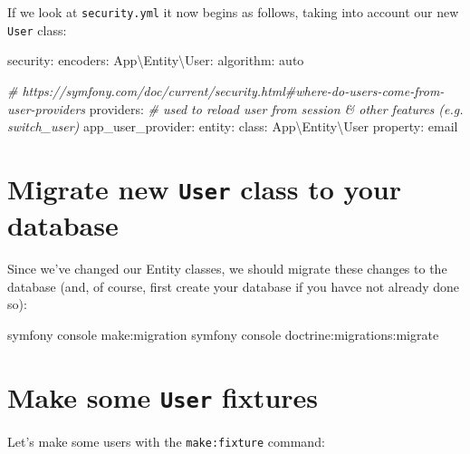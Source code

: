 \documentclass[a4paperpaper,openright]{book}
\newenvironment{Shaded}{}{}
\newcommand{\AttributeTok}[1]{\textcolor[rgb]{0.49,0.56,0.16}{#1}}
\newcommand{\CommentTok}[1]{\textcolor[rgb]{0.38,0.63,0.69}{\textit{#1}}}
\newcommand{\ExtensionTok}[1]{#1}
\newcommand{\FunctionTok}[1]{\textcolor[rgb]{0.02,0.16,0.49}{#1}}
\newcommand{\NormalTok}[1]{#1}
\begin{document}
If we look at \texttt{security.yml} it now begins as follows, taking
into account our new \texttt{User} class:

\begin{Shaded}
\begin{Highlighting}[]
    \FunctionTok{security:}
        \FunctionTok{encoders:}
            \FunctionTok{App\textbackslash{}Entity\textbackslash{}User:}
                \FunctionTok{algorithm:}\AttributeTok{ auto}
    
        \CommentTok{# https://symfony.com/doc/current/security.html#where-do-users-come-from-user-providers}
        \FunctionTok{providers:}
            \CommentTok{# used to reload user from session & other features (e.g. switch_user)}
            \FunctionTok{app_user_provider:}
                \FunctionTok{entity:}
                    \FunctionTok{class:}\AttributeTok{ App\textbackslash{}Entity\textbackslash{}User}
                    \FunctionTok{property:}\AttributeTok{ email}
\end{Highlighting}
\end{Shaded}

\hypertarget{migrate-new-user-class-to-your-database}{%
\section{\texorpdfstring{Migrate new \texttt{User} class to your
database}{Migrate new User class to your database}}\label{migrate-new-user-class-to-your-database}}

Since we've changed our Entity classes, we should migrate these changes
to the database (and, of course, first create your database if you havce
not already done so):

\begin{Shaded}
\begin{Highlighting}[]
    \ExtensionTok{symfony}\NormalTok{ console make:migration}
    \ExtensionTok{symfony}\NormalTok{ console doctrine:migrations:migrate}
\end{Highlighting}
\end{Shaded}

\hypertarget{make-some-user-fixtures}{%
\section{\texorpdfstring{Make some \texttt{User}
fixtures}{Make some User fixtures}}\label{make-some-user-fixtures}}

Let's make some users with the \texttt{make:fixture} command:
\end{document}
